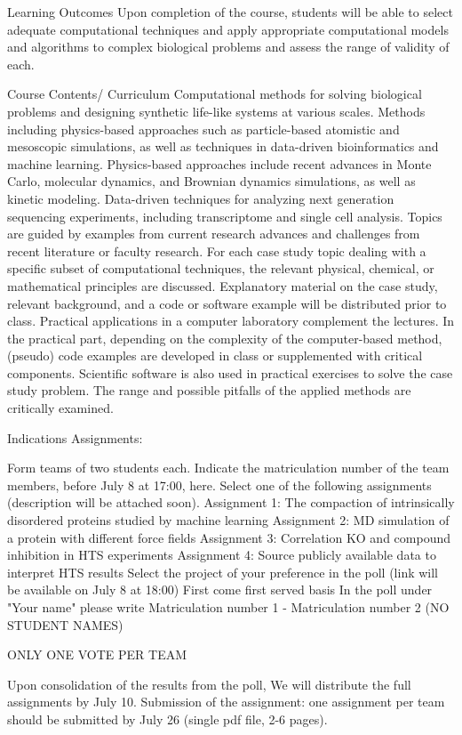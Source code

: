 Learning Outcomes
Upon completion of the course, students will be able to select adequate computational techniques and apply appropriate computational models and algorithms to complex biological problems and assess the range of validity of each.

Course Contents/ Curriculum
Computational methods for solving biological problems and designing synthetic life-like systems at various scales. 
Methods including physics-based approaches such as particle-based atomistic and mesoscopic simulations, as well as techniques in data-driven bioinformatics and machine learning. 
Physics-based approaches include recent advances in Monte Carlo, molecular dynamics, and Brownian dynamics simulations, as well as kinetic modeling.
Data-driven techniques for analyzing next generation sequencing experiments, including transcriptome and single cell analysis. 
Topics are guided by examples from current research advances and challenges from recent literature or faculty research. For each case study topic dealing with a specific subset of computational techniques, the relevant physical, chemical, or mathematical principles are discussed. Explanatory material on the case study, relevant background, and a code or software example will be distributed prior to class. Practical applications in a computer laboratory complement the lectures. In the practical part, depending on the complexity of the computer-based method, (pseudo) code examples are developed in class or supplemented with critical components. Scientific software is also used in practical exercises to solve the case study problem. The range and possible pitfalls of the applied methods are critically examined.

Indications Assignments:

 Form teams of two students each. Indicate the matriculation number of the team members, before July 8 at 17:00, here.  
Select one of the following assignments (description will be attached soon).
Assignment 1: The compaction of intrinsically disordered proteins studied by machine learning
Assignment 2: MD simulation of a protein with different force fields
Assignment 3: Correlation KO and compound inhibition in HTS experiments
Assignment 4: Source publicly available data to interpret HTS results   
Select the project of your preference in the poll (link will be available on July 8 at 18:00)
First come first served basis
In the poll under "Your name" please write 
Matriculation number 1 - Matriculation number 2   (NO STUDENT NAMES)

ONLY ONE VOTE PER TEAM

Upon consolidation of the results from the poll, We will distribute the full assignments by July 10.
Submission of the assignment:  one assignment per team should be submitted by July 26 (single pdf file, 2-6 pages). 